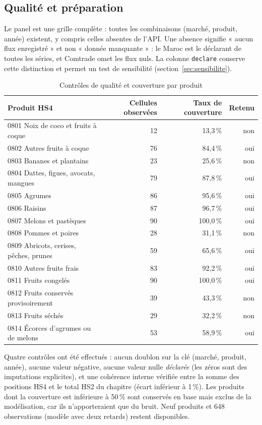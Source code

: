 \documentclass[11pt,a4paper]{article}
\begin{document}
\subsection{Qualité et préparation}

Le panel est une grille complète : toutes les combinaisons
(marché, produit, année) existent, y compris celles absentes de l'API. Une
absence signifie « aucun flux enregistré » et non « donnée manquante » : le
Maroc est le déclarant de toutes les séries, et Comtrade omet les flux nuls.
La colonne \texttt{declare} conserve cette distinction et permet un test de
sensibilité (section~\ref{sec:sensibilite}).

\begin{table}[H]
\centering
\caption{Contrôles de qualité et couverture par produit}\label{tab:qualite}
\small
\begin{tabular}{lrrr}
\toprule
Produit HS4 & Cellules observées & Taux de couverture & Retenu \\
\midrule
0801 Noix de coco et fruits à coque & 12 & 13,3\,\% & non \\
0802 Autres fruits à coque & 76 & 84,4\,\% & oui \\
0803 Bananes et plantains & 23 & 25,6\,\% & non \\
0804 Dattes, figues, avocats, mangues & 79 & 87,8\,\% & oui \\
0805 Agrumes & 86 & 95,6\,\% & oui \\
0806 Raisins & 87 & 96,7\,\% & oui \\
0807 Melons et pastèques & 90 & 100,0\,\% & oui \\
0808 Pommes et poires & 28 & 31,1\,\% & non \\
0809 Abricots, cerises, pêches, prunes & 59 & 65,6\,\% & oui \\
0810 Autres fruits frais & 83 & 92,2\,\% & oui \\
0811 Fruits congelés & 90 & 100,0\,\% & oui \\
0812 Fruits conservés provisoirement & 39 & 43,3\,\% & non \\
0813 Fruits séchés & 29 & 32,2\,\% & non \\
0814 Écorces d'agrumes ou de melons & 53 & 58,9\,\% & oui \\
\bottomrule
\end{tabular}
\end{table}

Quatre contrôles ont été effectués : aucun doublon sur la clé
(marché, produit, année), aucune valeur négative, aucune valeur nulle
\emph{déclarée} (les zéros sont des imputations explicites), et une cohérence
interne vérifiée entre la somme des positions HS4 et le total HS2 du chapitre
(écart inférieur à 1\,\%). Les produits dont la couverture est inférieure à
50\,\% sont conservés en base mais exclus de la modélisation, car ils
n'apporteraient que du bruit. Neuf produits et 648 observations
(modèle avec deux retards) restent disponibles.
\end{document}
